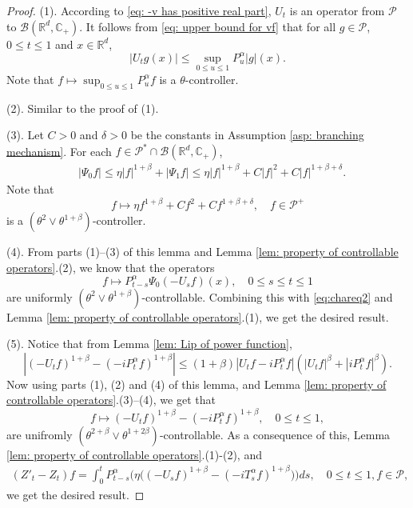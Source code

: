 \documentclass[12pt,a4paper]{amsart}
\theoremstyle{plain}
\theoremstyle{definition}
\numberwithin{equation}{section}
\begin{document}
\begin{proof}
    (1). According to \eqref{eq: -v has positive real part}, 
   $U_t$ is an operator from $\mathcal P$ to $\mathcal B(\mathbb R^d, \mathbb C_+)$.
    It follows from \eqref{eq: upper bound for vf} that for all $g\in \mathcal P$, $0\leq t\leq 1$ and $x\in \mathbb R^d$,
\[
    |U_t g(x)|
    \leq \sup_{0\leq u\leq 1}P_u^\alpha |g| (x).
\]
    Note that $f\mapsto\sup_{0\leq u\leq 1}P^{\alpha}_u f$ is a $\theta$-controller.

    (2). Similar to the proof of (1).

    (3). Let $C>0$ and $\delta > 0$ be the constants in Assumption \ref{asp: branching mechanism}.
    For each $f\in \mathcal P^* \cap \mathcal B(\mathbb R^d, \mathbb C_+)$,
\begin{equation}\begin{split}
    &|\Psi_0 f|
    \leq \eta |f|^{1+\beta} + |\Psi_1 f|
    \leq \eta |f|^{1+\beta} + C|f|^2+ C|f|^{1+\beta + \delta}.
\end{split}\end{equation}
    Note that
\[
    f \mapsto \eta f^{1+\beta} + Cf^2+ Cf^{1+\beta + \delta},\quad f\in \mathcal P^+
\]
     is a $(\theta^2 \vee \theta^{1+\beta})$-controller.

        (4). From parts (1)--(3) of this lemma 
    and Lemma \ref{lem: property of controllable operators}.(2), we know that the operators
\[
    f
    \mapsto P^\alpha_{t-s}\Psi_0(-U_sf)(x),
    \quad 0\leq s\leq t\leq 1
\]
    are uniformly $(\theta^2\vee \theta^{1+\beta})$-controllable.
    Combining this with \eqref{eq:chareq2} and Lemma \ref{lem: property of controllable operators}.(1), we get the desired result.

    (5). Notice that from Lemma \ref{lem: Lip of power function},
\[
    |(-U_t f)^{1+\beta} - (-iP^\alpha_t f)^{1+\beta} |
    \leq  (1+\beta) |U_t f-iP^\alpha_t f|(|U_t f|^{\beta}+|i P^\alpha_t f|^{\beta}).
\]
   Now using parts (1), (2) and  (4) of this lemma, 
    and Lemma \ref{lem: property of controllable operators}.(3)--(4), we get that
\[
    f \mapsto (-U_t f)^{1+\beta} - (-iP^\alpha_t f)^{1+\beta},\quad 0\leq t\leq 1,
\]
    are unifromly $(\theta^{2+\beta}\vee \theta^{1+2\beta})$-controllable.
    As a consequence of this, Lemma \ref{lem: property of controllable operators}.(1)-(2), and
\begin{equation}\begin{split}
    (Z'_t - Z_t)f = \int_0^t P^\alpha_{t-s}\Big( \eta \big((-U_s f)^{1+\beta} - (-iT_s^\alpha f)^{1+\beta} \big)\Big)ds,
    \quad 0\leq t\leq 1, f\in \mathcal P,
\end{split}\end{equation}
    we get the desired result.


\end{proof}
\end{document}
